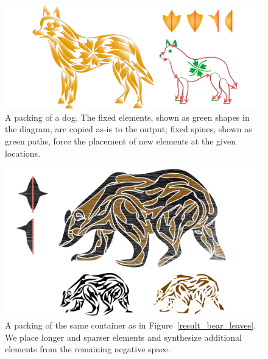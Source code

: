 \begin{figure}
\centering
\vspace{-20pt}
\includegraphics[width=1.0\textwidth]{figures/flowpak/dog_flower.pdf}
\caption[A packing of a dog]
{A packing of a dog. The fixed elements, shown as green
  shapes in the diagram, are copied as-is to the output; fixed spines,
  shown as green paths, force the placement of new elements at the given
  locations.}
\label{result_dog}
\end{figure}

\begin{figure}
\centering
\includegraphics[width=1.0\textwidth]{figures/flowpak/bear_offset_space.pdf}
\caption[A packing of a bear with a few elements created from negative space]
{A packing of the same container as in Figure~\ref{result_bear_leaves}.
  We place longer and sparser elements and synthesize additional elements 
  from the remaining negative space.
  }
\label{result_bear_offset}
\end{figure}

